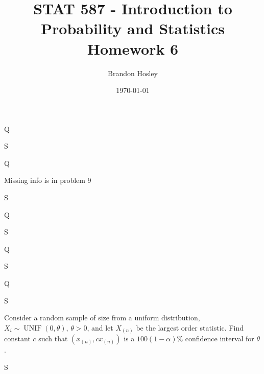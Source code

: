 \documentclass[answers]{exam}
\title{STAT 587 - Introduction to Probability and Statistics%
	\\ Homework 6}
\author{Brandon Hosley}
\date{\today}
\begin{document}
\maketitle
\begin{questions}

\question 
Q
\begin{solution}
	S
\end{solution}

\question 
Q

Missing info is in problem 9
\begin{solution}
	S
\end{solution}

\question 
Q
\begin{solution}
	S
\end{solution}

\question 
Q
\begin{solution}
	S
\end{solution}

\question 
Q
\begin{solution}
	S
\end{solution}

\question 
Consider a random sample of size from a uniform distribution,
\(X_i\sim\operatorname{UNIF}(0,\theta)\), \(\theta>0\),
and let \(X_{(n)}\) be the largest order statistic. 
Find constant \(c\) such that \((x_{(n)},cx_{(n)})\) is a \(100(1-\alpha)\%\) 
confidence interval for \(\theta\).
\begin{solution}
	S
\end{solution}


\end{questions}
\end{document}
